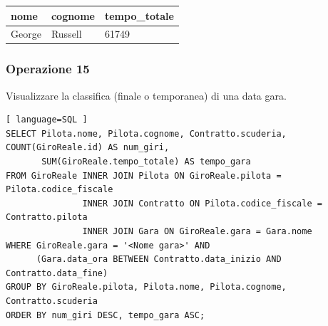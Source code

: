 \documentclass[11pt]{article}
\begin{document}
\begin{table}[H]
    \centering
    \begin{tabular}{|l|l|l|}
    \hline
        nome & cognome & tempo\_totale \\ \hline
        George & Russell & 61749 \\ \hline
    \end{tabular}
\end{table}


\subsubsection{Operazione 15}
Visualizzare la classifica (finale o temporanea) di una data gara.
\begin{lstlisting}[ language=SQL ]
SELECT Pilota.nome, Pilota.cognome, Contratto.scuderia, COUNT(GiroReale.id) AS num_giri, 
       SUM(GiroReale.tempo_totale) AS tempo_gara
FROM GiroReale INNER JOIN Pilota ON GiroReale.pilota = Pilota.codice_fiscale
               INNER JOIN Contratto ON Pilota.codice_fiscale = Contratto.pilota
               INNER JOIN Gara ON GiroReale.gara = Gara.nome
WHERE GiroReale.gara = '<Nome gara>' AND
      (Gara.data_ora BETWEEN Contratto.data_inizio AND Contratto.data_fine)
GROUP BY GiroReale.pilota, Pilota.nome, Pilota.cognome, Contratto.scuderia
ORDER BY num_giri DESC, tempo_gara ASC;
\end{lstlisting}
\end{document}
